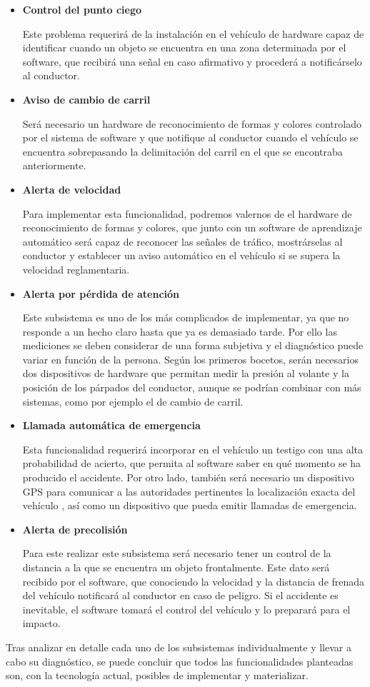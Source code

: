 \begin{itemize}[-]
\item \textbf{Control del punto ciego}
\par Este problema requerirá de la instalación en el vehículo de hardware capaz de identificar cuando un objeto se encuentra en una zona determinada por el software, que recibirá una señal en caso afirmativo y procederá a notificárselo al conductor.

\item \textbf{Aviso de cambio de carril}
\par Será necesario un hardware de reconocimiento de formas y colores controlado por el sistema de software y que notifique al conductor cuando el vehículo se encuentra sobrepasando la delimitación del carril en el que se encontraba anteriormente.

\item \textbf{Alerta de velocidad}
\par Para implementar esta funcionalidad, podremos valernos de el hardware de reconocimiento de formas y colores, que junto con un software de aprendizaje automático será capaz de reconocer las señales de tráfico, mostrárselas al conductor y establecer un aviso automático en el vehículo si se supera la velocidad reglamentaria.

\item \textbf{Alerta por pérdida de atención}
\par Este subsistema es uno de los más complicados de implementar, ya que no responde a un hecho claro hasta que ya es demasiado tarde. Por ello las mediciones se deben considerar de una forma subjetiva y el diagnóstico puede variar en función de la persona. Según los primeros bocetos, serán necesarios dos dispositivos de hardware que permitan medir la presión al volante y la posición de los párpados del conductor, aunque se podrían combinar con más sistemas, como por ejemplo el de cambio de carril.

\item \textbf{Llamada automática de emergencia}
\par Esta funcionalidad requerirá incorporar en el vehículo un testigo con una alta probabilidad de acierto, que permita al software saber en qué momento se ha producido el accidente. Por otro lado, también será necesario un dispositivo GPS para comunicar a las autoridades pertinentes la localización exacta del vehículo , así como un dispositivo que pueda emitir llamadas de emergencia.

\item \textbf{Alerta de precolisión}
\par Para este realizar este subsistema será necesario tener un control de la distancia a la que se encuentra un objeto frontalmente. Este dato será recibido por el software, que conociendo la velocidad y la distancia de frenada del vehículo notificará al conductor en caso de peligro. Si el accidente es inevitable, el software tomará el control del vehículo y lo preparará para el impacto.

\end{itemize}

\par Tras analizar en detalle cada uno de los subsistemas individualmente y llevar a cabo su diagnóstico, se puede concluir que todos las funcionalidades planteadas son, con la tecnología actual, posibles de implementar y materializar.
